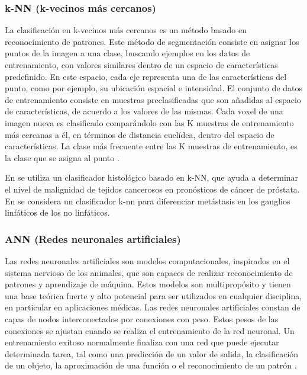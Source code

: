 \subsubsection{k-NN (k-vecinos más cercanos)}
La clasificación en k-vecinos más cercanos es un método basado en reconocimiento de patrones. Este método de segmentación consiste en asignar los puntos de la imagen a una clase, buscando ejemplos en los datos de entrenamiento, con valores similares dentro de un espacio de características predefinido. En este espacio, cada eje representa una de las características del punto, como por ejemplo, su ubicación espacial e intensidad. El conjunto de datos de entrenamiento consiste en muestras preclasificadas que son añadidas al espacio de características, de acuerdo a los valores de las mismas. Cada voxel de una imagen nueva es clasificado comparándolo con las K muestras de entrenamiento más cercanas a él, en términos de distancia euclídea, dentro del espacio de características. La clase más frecuente entre las K muestras de entrenamiento, es la clase que se asigna al punto \citep{anbeek2008automated}.

En \citep{jafari2003multiwavelet} se utiliza un clasificador histológico basado en k-NN, que ayuda a determinar el nivel de malignidad de tejidos cancerosos en pronósticos de cáncer de próstata. En \citep{li2012using} se considera un clasificador k-nn para diferenciar metástasis en los ganglios linfáticos de los no linfáticos.

\subsubsection{ANN (Redes neuronales artificiales)}
Las redes neuronales artificiales son modelos computacionales, inspirados en el sistema nervioso de los animales, que son capaces de realizar reconocimiento de patrones y aprendizaje de máquina. Estos modelos son multipropósito y tienen una base teórica fuerte y alto potencial para ser utilizados en cualquier disciplina, en particular en aplicaciones médicas. Las redes neuronales artificiales constan de capas de nodos interconectados por conexiones con peso. Estos pesos de las conexiones se ajustan cuando se realiza el entrenamiento de la red neuronal. Un entrenamiento exitoso normalmente finaliza con una red que puede ejecutar determinada tarea, tal como una predicción de un valor de salida, la clasificación de un objeto, la aproximación de una función o el reconocimiento de un patrón \citep{dayhoff2001artificial}.

